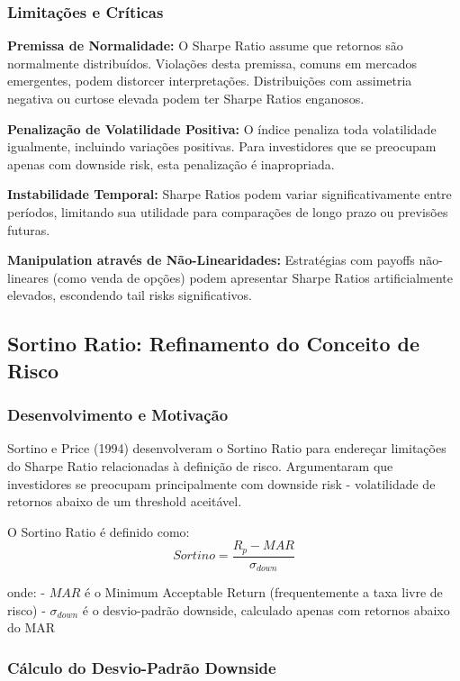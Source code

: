 \subsubsection{Limitações e Críticas}

\textbf{Premissa de Normalidade:} O Sharpe Ratio assume que retornos são normalmente distribuídos. Violações desta premissa, comuns em mercados emergentes, podem distorcer interpretações. Distribuições com assimetria negativa ou curtose elevada podem ter Sharpe Ratios enganosos.

\textbf{Penalização de Volatilidade Positiva:} O índice penaliza toda volatilidade igualmente, incluindo variações positivas. Para investidores que se preocupam apenas com downside risk, esta penalização é inapropriada.

\textbf{Instabilidade Temporal:} Sharpe Ratios podem variar significativamente entre períodos, limitando sua utilidade para comparações de longo prazo ou previsões futuras.

\textbf{Manipulation através de Não-Linearidades:} Estratégias com payoffs não-lineares (como venda de opções) podem apresentar Sharpe Ratios artificialmente elevados, escondendo tail risks significativos.

\subsection{Sortino Ratio: Refinamento do Conceito de Risco}

\subsubsection{Desenvolvimento e Motivação}

Sortino e Price (1994) desenvolveram o Sortino Ratio para endereçar limitações do Sharpe Ratio relacionadas à definição de risco. Argumentaram que investidores se preocupam principalmente com downside risk - volatilidade de retornos abaixo de um threshold aceitável.

O Sortino Ratio é definido como:
\begin{equation}
Sortino = \frac{R_p - MAR}{\sigma_{down}}
\end{equation}

onde:
- $MAR$ é o Minimum Acceptable Return (frequentemente a taxa livre de risco)
- $\sigma_{down}$ é o desvio-padrão downside, calculado apenas com retornos abaixo do MAR

\subsubsection{Cálculo do Desvio-Padrão Downside}


